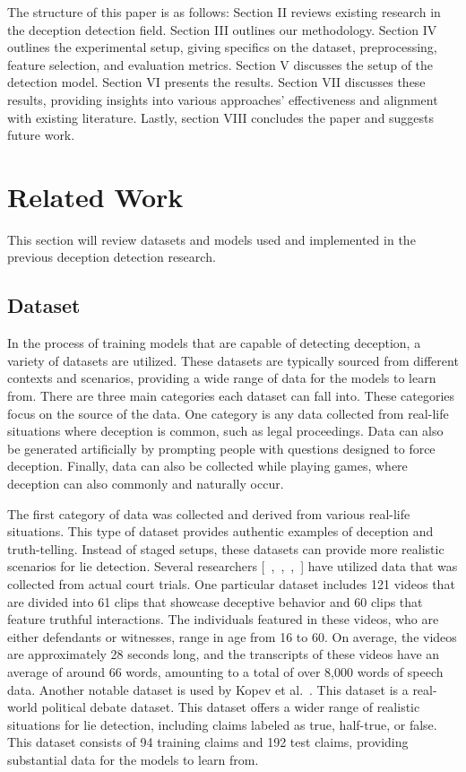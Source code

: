 \documentclass[12pt]{article}
\begin{document}
The structure of this paper is as follows: Section II reviews existing research in the deception detection field. Section III outlines our methodology. Section IV outlines the experimental setup, giving specifics on the dataset, preprocessing, feature selection, and evaluation metrics. Section V discusses the setup of the detection model. Section VI presents the results. Section VII discusses these results, providing insights into various approaches' effectiveness and alignment with existing literature. Lastly, section VIII concludes the paper and suggests future work.
 



\section{Related Work}
This section will review datasets and models used and implemented in the previous deception detection research.
\subsection{Dataset}
In the process of training models that are capable of detecting deception, a variety of datasets are utilized. These datasets are typically sourced from different contexts and scenarios, providing a wide range of data for the models to learn from. There are three main categories each dataset can fall into. These categories focus on the source of the data. One category is any data collected from real-life situations where deception is common, such as legal proceedings. Data can also be generated artificially by prompting people with questions designed to force deception. Finally, data can also be collected while playing games, where deception can also commonly and naturally occur.

The first category of data was collected and derived from various real-life situations. This type of dataset provides authentic examples of deception and truth-telling.  Instead of staged setups, these datasets can provide more realistic scenarios for lie detection. Several researchers [~\cite{bareeda2021lie},~\cite{hsiao2022attention},~\cite{csen2020multimodal},~\cite{sehrawat2023deception}] have utilized data that was collected from actual court trials. One particular dataset includes 121 videos that are divided into 61 clips that showcase deceptive behavior and 60 clips that feature truthful interactions. The individuals featured in these videos, who are either defendants or witnesses, range in age from 16 to 60. On average, the videos are approximately 28 seconds long, and the transcripts of these videos have an average of around 66 words, amounting to a total of over 8,000 words of speech data. Another notable dataset is used by Kopev et al.~\cite{kopev2019detecting}. This dataset is a real-world political debate dataset. This dataset offers a wider range of realistic situations for lie detection, including claims labeled as true, half-true, or false. This dataset consists of 94 training claims and 192 test claims, providing substantial data for the models to learn from.
\end{document}
